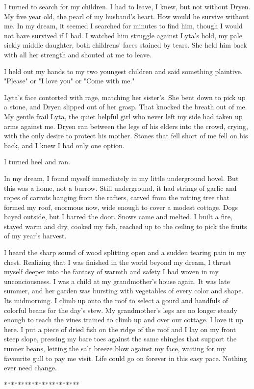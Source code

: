 I turned to search for my children. I had to leave, I knew, but not without Dryen. My five year old, the pearl of my husband's heart. How would he survive without me. In my dream, it seemed I searched for minutes to find him, though I would not have survived if I had. I watched him struggle against Lyta's hold, my pale sickly middle daughter, both childrens' faces stained by tears. She held him back with all her strength and shouted at me to leave. 

I held out my hands to my two youngest children and said something plaintive. "Please" or "I love you" or "Come with me." 

Lyta's face contorted with rage, matching her sister's. She bent down to pick up a stone, and Dryen slipped out of her grasp. That knocked the breath out of me. My gentle frail Lyta, the quiet helpful girl who never left my side had taken up arms against me. Dryen ran between the legs of his elders into the crowd, crying, with the only desire to protect his mother. Stones that fell short of me fell on his back, and I knew I had only one option. 

I turned heel and ran.

In my dream, I found myself immediately in my little underground hovel. But this was a home, not a burrow. Still underground, it had strings of garlic and ropes of carrots hanging from the rafters, carved from the rotting tree that formed my roof, enormous now, wide enough to cover a modest cottage. Dogs bayed outside, but I barred the door. Snows came and melted. I built a fire, stayed warm and dry, cooked my fish, reached up to the ceiling to pick the fruits of my year's harvest. 

I heard the sharp sound of wood splitting open and a sudden tearing pain in my chest. Realizing that I was finished in the world beyond my dream, I thrust myself deeper into the fantasy of warmth and safety I had woven in my unconciousness. I was a child at my grandmother's house again. It was late summer, and her garden was bursting with vegetables of every color and shape. Its midmorning. I climb up onto the roof to select a gourd and handfuls of colorful beans for the day's stew. My grandmother's legs are no longer steady enough to reach the vines trained to climb up and over our cottage. I love it up here. I put a piece of dried fish on the ridge of the roof and I lay on my front steep slope, pressing my bare toes against the same shingles that support the runner beans, letting the salt breeze blow against my face, waiting for my favourite gull to pay me visit. Life could go on forever in this easy pace. Nothing ever need change.

**********************
